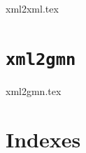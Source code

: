 \documentclass[11pt,a4paper]{report}
\begin{document}
{xml2xml.tex}


\part{{\tt xml2gmn}}

{xml2gmn.tex}



\part{Indexes}

\useListsPagesHeadersAndFooters

\printindex[Files]

\printindex[Options]

\printindex[MusicXML]

\printindex[Main]


\end{document}
